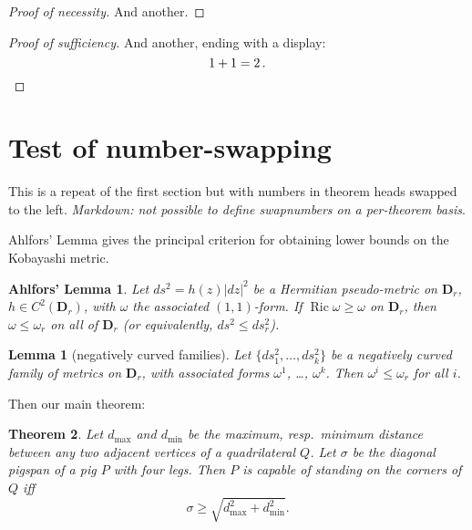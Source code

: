 \documentclass[
]{article}
\theoremstyle{plain}
\theoremstyle{plain}
\newtheorem{theorem}{Theorem}[section]
\theoremstyle{plain}
\newtheorem{lemma}[theorem]{Lemma}
\theoremstyle{plain}
\theoremstyle{plain}
\theoremstyle{exercise}
\theoremstyle{note}
\theoremstyle{break}
\theoremstyle{citing}
\theoremstyle{plain}
\newtheorem*{ahlfors�___lemma-1}{Ahlfors' Lemma}
\begin{document}
\begin{proof}[Proof of \emph{necessity}]

And another.

\end{proof}

\begin{proof}[Proof of \emph{sufficiency}]

And another, ending with a display: \[1+1=2\,. \qedhere\]

\end{proof}

\hypertarget{test-of-number-swapping}{%
\section{Test of number-swapping}\label{test-of-number-swapping}}

This is a repeat of the first section but with numbers in theorem heads
swapped to the left. \emph{Markdown: not possible to define swapnumbers
on a per-theorem basis}.

Ahlfors' Lemma gives the principal criterion for obtaining lower bounds
on the Kobayashi metric.

\begin{ahlfors�___lemma-1}

\protect\hypertarget{ahlforsuxfffd---lemma-1}{}{}Let
\(ds^2 = h(z)|dz|^2\) be a Hermitian pseudo-metric on \(\mathbf{D}_r\),
\(h\in C^2(\mathbf{D}_r)\), with \(\omega\) the associated
\((1,1)\)-form. If \(\mathop{\mathrm{Ric}}\nolimits\omega\geq\omega\) on
\(\mathbf{D}_r\), then \(\omega\leq\omega_r\) on all of \(\mathbf{D}_r\)
(or equivalently, \(ds^2\leq ds_r^2\)).

\end{ahlfors�___lemma-1}

\begin{lemma}[negatively curved families]

Let \(\{ds_1^2,\dots,ds_k^2\}\) be a negatively curved family of metrics
on \(\mathbf{D}_r\), with associated forms \(\omega^1\), \ldots,
\(\omega^k\). Then \(\omega^i \leq\omega_r\) for all \(i\).

\end{lemma}

Then our main theorem:

\begin{theorem}

Let \(d_{\max}\) and \(d_{\min}\) be the maximum, resp.~minimum distance
between any two adjacent vertices of a quadrilateral \(Q\). Let
\(\sigma\) be the diagonal pigspan of a pig \(P\) with four legs. Then
\(P\) is capable of standing on the corners of \(Q\) iff \[\label{sdq}
\sigma\geq \sqrt{d_{\max}^2+d_{\min}^2}.\]

\end{theorem}
\end{document}
